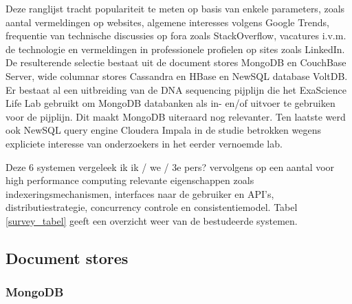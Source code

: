 \begin{landscape}

\label{survey_tabel}
\end{landscape}

Deze ranglijst tracht populariteit te meten op basis van enkele parameters, zoals aantal vermeldingen op websites, algemene interesses volgens Google Trends, frequentie van technische discussies op fora zoals StackOverflow, vacatures i.v.m. de technologie en vermeldingen in professionele profielen op sites zoals LinkedIn. De resulterende selectie bestaat uit de document stores MongoDB en CouchBase Server, wide columnar stores Cassandra en HBase en NewSQL database VoltDB. Er bestaat al een uitbreiding van de DNA sequencing pijplijn die het ExaScience Life Lab gebruikt om MongoDB  databanken als in- en/of uitvoer te gebruiken voor de pijplijn. Dit maakt MongoDB uiteraard nog relevanter. Ten laatste werd ook NewSQL query engine Cloudera Impala in de studie betrokken wegens expliciete interesse van onderzoekers in het eerder vernoemde lab.

\noindent Deze 6 systemen vergeleek ik {\color{red} ik / we / 3e pers?}
vervolgens op een aantal voor high performance computing relevante eigenschappen zoals indexeringsmechanismen, interfaces naar de gebruiker en API's, distributiestrategie, concurrency controle en consistentiemodel. Tabel \ref{survey_tabel} geeft een overzicht weer van de bestudeerde systemen.

\subsection{Document stores}

\subsubsection{MongoDB}

